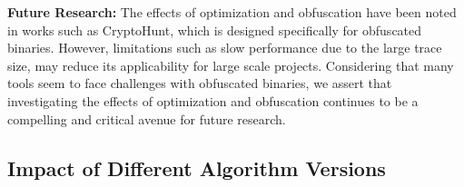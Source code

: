 
\begin{takeaway}
\textbf{Future Research:} The effects of optimization and obfuscation have been noted in works such as CryptoHunt, which is designed specifically for obfuscated binaries. However, limitations such as slow performance due to the large trace size, may reduce its applicability for large scale projects. Considering that many tools seem to face challenges with obfuscated binaries, we assert that investigating the effects of optimization and obfuscation continues to be a compelling and critical avenue for future research.
\end{takeaway}


\subsection{Impact of Different Algorithm Versions}
\label{subsec:cryptobinary-algo-version}
  

